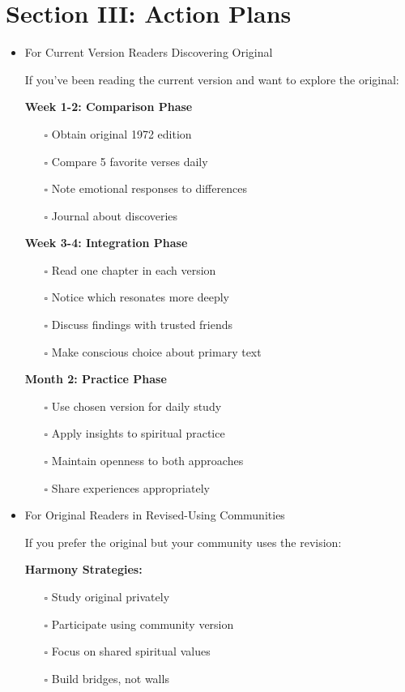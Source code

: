 \documentclass[11pt,twoside]{book}
\begin{document}
\section*{Section III: Action Plans}
\label{sec:org047720e}

\begin{itemize}
\item For Current Version Readers Discovering Original
\label{sec:orge7685bb}

If you've been reading the current version and want to explore the original:

\textbf{\textbf{Week 1-2: Comparison Phase}}
\begin{itemize}
\item[{$\square$}] Obtain original 1972 edition
\item[{$\square$}] Compare 5 favorite verses daily
\item[{$\square$}] Note emotional responses to differences
\item[{$\square$}] Journal about discoveries
\end{itemize}

\textbf{\textbf{Week 3-4: Integration Phase}}
\begin{itemize}
\item[{$\square$}] Read one chapter in each version
\item[{$\square$}] Notice which resonates more deeply
\item[{$\square$}] Discuss findings with trusted friends
\item[{$\square$}] Make conscious choice about primary text
\end{itemize}

\textbf{\textbf{Month 2: Practice Phase}}
\begin{itemize}
\item[{$\square$}] Use chosen version for daily study
\item[{$\square$}] Apply insights to spiritual practice
\item[{$\square$}] Maintain openness to both approaches
\item[{$\square$}] Share experiences appropriately
\end{itemize}
\item For Original Readers in Revised-Using Communities
\label{sec:org8500f75}

If you prefer the original but your community uses the revision:

\textbf{\textbf{Harmony Strategies:}}
\begin{itemize}
\item[{$\square$}] Study original privately
\item[{$\square$}] Participate using community version
\item[{$\square$}] Focus on shared spiritual values
\item[{$\square$}] Build bridges, not walls
\end{itemize}


\end{itemize}
\end{document}
